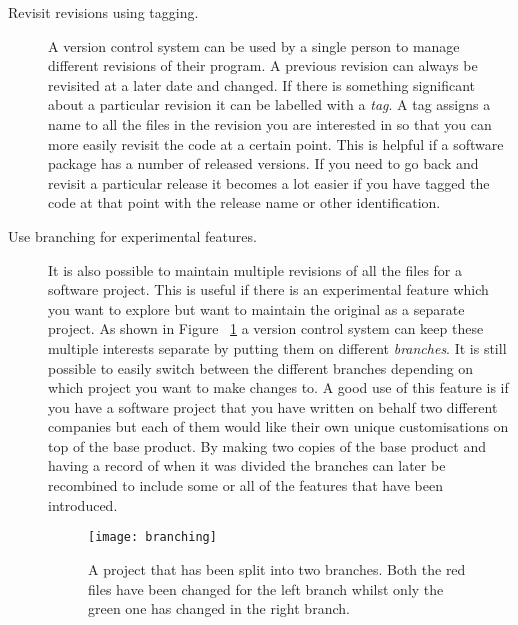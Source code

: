 \begin{description}

  \item [Revisit revisions using tagging.]
  A version control system can be used by a single person to manage different revisions of their program. 
  A previous revision can always be revisited at a later date and changed. 
  If there is something significant about a particular revision it can be labelled with a \emph{tag}. 
  A tag assigns a name to all the files in the revision you are interested in so that you can more easily revisit the code at a certain point.  
  This is helpful if a software package has a number of released versions.  
  If you need to go back and revisit a particular release it becomes a lot easier if you have tagged the code at that point with the release name or other identification.
   
   

  
  \item [Use branching for experimental features.] 
  It is also possible to maintain multiple revisions of all the files for a software project. 
  This is useful if there is an experimental feature which you want to explore but want to maintain the original as a separate project. 
  As shown in Figure ~\ref{fig:bgBranches} a version control system can keep these multiple interests separate by putting them on different \emph{branches}. 
  It is still possible to easily switch between the different branches depending on which project you want to make changes to.  
  A good use of this feature is if you have a software project that you have written on behalf two different companies but each of them would like their own unique customisations on top of the base product.  
  By making two copies of the base product and having a record of when it was divided the branches can later be recombined to include some or all of the features that have been introduced.  

  \begin{figure}[!t]
   \begin{center}
    \texttt{[image: branching]}
   \end{center}
   \caption{A project that has been split into two branches. Both the red files have been changed for the left branch whilst only the green one has changed in the right branch.}
   \label{fig:bgBranches}
  \end{figure}



\end{description}
